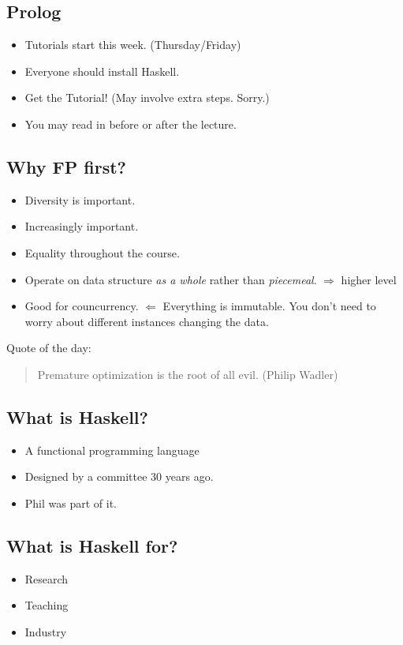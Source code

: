 \documentclass{article}
\begin{document}
\subsection{Prolog}
\begin{itemize}
    \item Tutorials start this week. (Thursday/Friday)
    \item Everyone should install Haskell.
    \item Get the Tutorial! (May involve extra steps. Sorry.)
    \item You may read in before or after the lecture.
\end{itemize}
\subsection{Why FP first?}
\begin{itemize}
    \item Diversity is important.
    \item Increasingly important.
    \item Equality throughout the course.
    \item Operate on data structure \emph{as a whole} rather than \emph{piecemeal}. $\Rightarrow$ higher level
    \item Good for councurrency.
    $\Leftarrow$ Everything is immutable.
    You don't need to worry about different instances changing the data.
\end{itemize}
Quote of the day:
\begin{quotation}
    Premature optimization is the root of all evil.
    (Philip Wadler)
\end{quotation}
\subsection{What is Haskell?}
\begin{itemize}
    \item A functional programming language
    \item Designed by a committee 30 years ago.
    \item Phil was part of it.
\end{itemize}
\subsection{What is Haskell for?}
\begin{itemize}
    \item Research
    \item Teaching
    \item Industry
\end{itemize}
\end{document}
